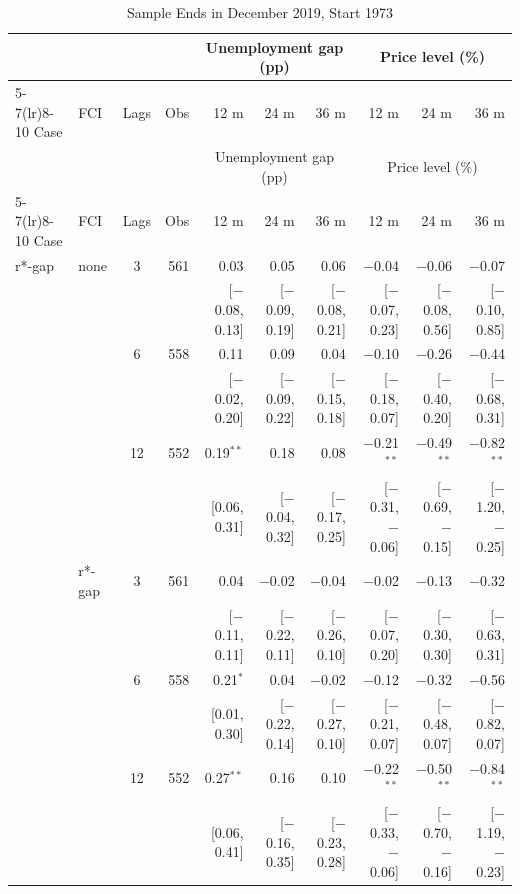 \begingroup\scriptsize\setlength{\tabcolsep}{0.9pt}
\begin{longtable}{llcrrrrrrr}
\caption{Sample Ends in December 2019, Start 1973}\label{tab:appR1e}\\
\toprule
 & & & & \multicolumn{3}{c}{Unemployment gap (pp)} & \multicolumn{3}{c}{Price level (\%)}\\ \cmidrule(lr){5-7}\cmidrule(lr){8-10}
Case & FCI & Lags & Obs & 12 m & 24 m & 36 m & 12 m & 24 m & 36 m\\
\midrule\endfirsthead
\toprule
 & & & & \multicolumn{3}{c}{Unemployment gap (pp)} & \multicolumn{3}{c}{Price level (\%)}\\ \cmidrule(lr){5-7}\cmidrule(lr){8-10}
Case & FCI & Lags & Obs & 12 m & 24 m & 36 m & 12 m & 24 m & 36 m\\
\midrule\endhead
\bottomrule\endfoot
r*-gap & none & 3 & 561 & 0.03 & 0.05 & 0.06 & $-$0.04 & $-$0.06 & $-$0.07\\
 & & & & {\scriptsize [$-$0.08, 0.13]} & {\scriptsize [$-$0.09, 0.19]} & {\scriptsize [$-$0.08, 0.21]} & {\scriptsize [$-$0.07, 0.23]} & {\scriptsize [$-$0.08, 0.56]} & {\scriptsize [$-$0.10, 0.85]}\\
 &  & 6 & 558 & 0.11 & 0.09 & 0.04 & $-$0.10 & $-$0.26 & $-$0.44\\
 & & & & {\scriptsize [$-$0.02, 0.20]} & {\scriptsize [$-$0.09, 0.22]} & {\scriptsize [$-$0.15, 0.18]} & {\scriptsize [$-$0.18, 0.07]} & {\scriptsize [$-$0.40, 0.20]} & {\scriptsize [$-$0.68, 0.31]}\\
 &  & 12 & 552 & 0.19$^{**}$ & 0.18 & 0.08 & $-$0.21$^{**}$ & $-$0.49$^{**}$ & $-$0.82$^{**}$\\
 & & & & {\scriptsize [0.06, 0.31]} & {\scriptsize [$-$0.04, 0.32]} & {\scriptsize [$-$0.17, 0.25]} & {\scriptsize [$-$0.31, $-$0.06]} & {\scriptsize [$-$0.69, $-$0.15]} & {\scriptsize [$-$1.20, $-$0.25]}\\
 & r*-gap & 3 & 561 & 0.04 & $-$0.02 & $-$0.04 & $-$0.02 & $-$0.13 & $-$0.32\\
 & & & & {\scriptsize [$-$0.11, 0.11]} & {\scriptsize [$-$0.22, 0.11]} & {\scriptsize [$-$0.26, 0.10]} & {\scriptsize [$-$0.07, 0.20]} & {\scriptsize [$-$0.30, 0.30]} & {\scriptsize [$-$0.63, 0.31]}\\
 &  & 6 & 558 & 0.21$^{*}$ & 0.04 & $-$0.02 & $-$0.12 & $-$0.32 & $-$0.56\\
 & & & & {\scriptsize [0.01, 0.30]} & {\scriptsize [$-$0.22, 0.14]} & {\scriptsize [$-$0.27, 0.10]} & {\scriptsize [$-$0.21, 0.07]} & {\scriptsize [$-$0.48, 0.07]} & {\scriptsize [$-$0.82, 0.07]}\\
 &  & 12 & 552 & 0.27$^{**}$ & 0.16 & 0.10 & $-$0.22$^{**}$ & $-$0.50$^{**}$ & $-$0.84$^{**}$\\
 & & & & {\scriptsize [0.06, 0.41]} & {\scriptsize [$-$0.16, 0.35]} & {\scriptsize [$-$0.23, 0.28]} & {\scriptsize [$-$0.33, $-$0.06]} & {\scriptsize [$-$0.70, $-$0.16]} & {\scriptsize [$-$1.19, $-$0.23]}\\
\end{longtable}

